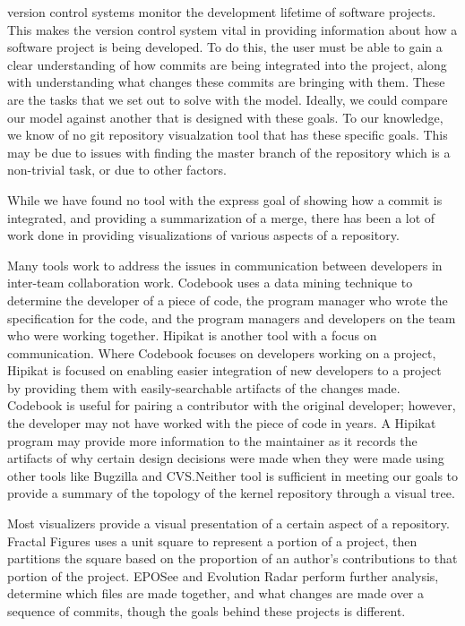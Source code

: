 
version control systems monitor the development lifetime of software
projects. This makes the version control system vital in providing
information about how a software project is being developed. To do this,
the user must be able to gain a clear understanding of how commits are
being integrated into the project, along with understanding what changes
these commits are bringing with them. These are the tasks that we set
out to solve with the \mt model. Ideally, we could compare our model
against another that is designed with these goals. To our knowledge, we
know of no git repository visualzation tool that has these specific
goals. This may be due to issues with finding the master branch of the
repository which is a non-trivial task, or due to other factors.

While we have found no tool with the express goal of showing how a
commit is integrated, and providing a summarization of a merge, there
has been a lot of work done in providing visualizations of various
aspects of a repository.

Many tools work to address the issues in communication between
developers in inter-team collaboration work. Codebook\cite{Begel2010}
uses a data mining technique to determine the developer of a piece of
code, the program manager who wrote the specification for the code, and
the program managers and developers on the team who were working
together. Hipikat\cite{Cubranic2005} is another tool with a focus on
communication. Where Codebook focuses on developers working on a
project, Hipikat is focused on enabling easier integration of new
developers to a project by providing them with easily-searchable
artifacts of the changes made. Codebook is useful for pairing a
contributor with the original developer; however, the developer may not
have worked with the piece of code in years. A Hipikat program may
provide more information to the maintainer as it records the artifacts
of why certain design decisions were made when they were made using
other tools like Bugzilla and CVS.\@ Neither tool is sufficient in
meeting our goals to provide a summary of the topology of the kernel
repository through a visual tree.

Most visualizers provide a visual presentation of a certain aspect of a
repository. Fractal Figures\cite{Ambros2005} uses a unit square to
represent a portion of a project, then partitions the square based on
the proportion of an author's contributions to that portion of the
project. EPOSee\cite{Burch2005} and Evolution Radar\cite{Ambros2009}
perform further analysis, determine which files are made together, and
what changes are made over a sequence of commits, though the goals
behind these projects is different.

